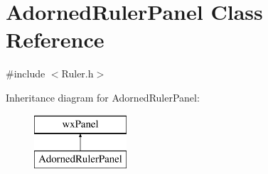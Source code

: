 \hypertarget{class_adorned_ruler_panel}{}\section{Adorned\+Ruler\+Panel Class Reference}
\label{class_adorned_ruler_panel}


{\ttfamily \#include $<$Ruler.\+h$>$}

Inheritance diagram for Adorned\+Ruler\+Panel\+:\begin{figure}[H]
\begin{center}
\leavevmode
\includegraphics[height=2.000000cm]{class_adorned_ruler_panel}
\end{center}
\end{figure}
